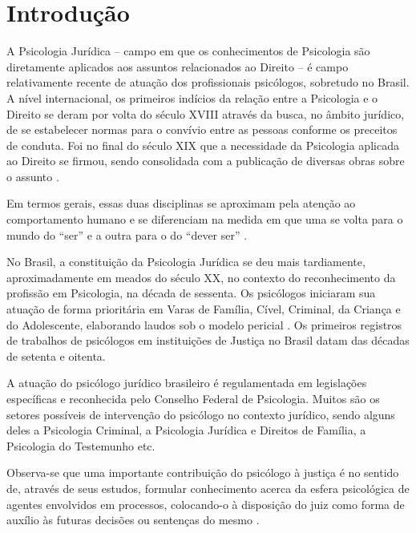 
\chapter*[Introdução]{Introdução}

A Psicologia Jurídica -- campo em que os conhecimentos de Psicologia são diretamente aplicados aos assuntos relacionados ao Direito -- é campo relativamente recente de atuação dos profissionais psicólogos, sobretudo no Brasil. A nível internacional, os primeiros indícios da relação entre a Psicologia e o Direito se deram por volta do século XVIII através da busca, no âmbito jurídico, de se estabelecer normas para o convívio entre as pessoas conforme os preceitos de conduta. Foi no final do século XIX que a necessidade da Psicologia aplicada ao Direito se firmou, sendo consolidada com a publicação de diversas obras sobre o assunto \cite{JESUS2001}. 

Em termos gerais, essas duas disciplinas se aproximam pela atenção ao comportamento humano e se diferenciam na medida em que uma se volta para o mundo do ``ser'' e a outra para o do ``dever ser'' . 

No Brasil, a constituição da Psicologia Jurídica se deu mais tardiamente, aproximadamente em meados do século XX, no contexto do reconhecimento da profissão em Psicologia, na década de sessenta. Os psicólogos iniciaram sua atuação de forma prioritária em Varas de Família, Cível, Criminal, da Criança e do Adolescente, elaborando laudos sob o modelo pericial \cite{COSTA2009}. Os primeiros  registros de trabalhos de psicólogos em instituições de Justiça no Brasil datam das décadas de setenta e oitenta.

A atuação do psicólogo jurídico brasileiro é regulamentada em legislações específicas e reconhecida pelo Conselho Federal de Psicologia. Muitos são os setores possíveis de intervenção do psicólogo no contexto jurídico, sendo alguns deles a Psicologia Criminal, a Psicologia Jurídica e Direitos de Família, a Psicologia do Testemunho etc. 

Observa-se que uma importante contribuição do psicólogo à justiça é no sentido de, através de seus estudos, formular conhecimento acerca da esfera psicológica de agentes envolvidos em processos, colocando-o à disposição do juiz como forma de auxílio às futuras decisões ou sentenças do mesmo .

